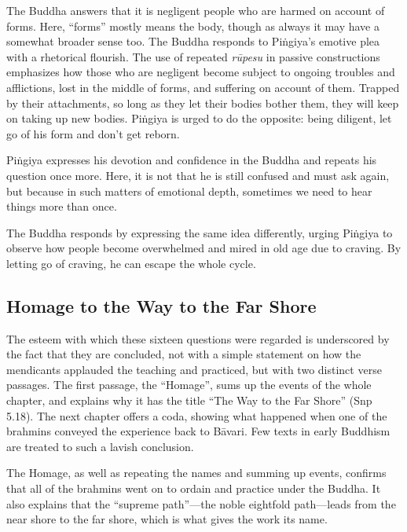 \documentclass[12pt,openany]{book}%
\begin{document}
The Buddha answers that it is negligent people who are harmed on account of forms. Here, “forms” mostly means the body, though as always it may have a somewhat broader sense too. The Buddha responds to \textsanskrit{Piṅgiya}’s emotive plea with a rhetorical flourish. The use of repeated \textit{\textsanskrit{rūpesu}} in passive constructions emphasizes how those who are negligent become subject to ongoing troubles and afflictions, lost in the middle of forms, and suffering on account of them. Trapped by their attachments, so long as they let their bodies bother them, they will keep on taking up new bodies. \textsanskrit{Piṅgiya} is urged to do the opposite: being diligent, let go of his form and don’t get reborn.

\textsanskrit{Piṅgiya} expresses his devotion and confidence in the Buddha and repeats his question once more. Here, it is not that he is still confused and must ask again, but because in such matters of emotional depth, sometimes we need to hear things more than once.

The Buddha responds by expressing the same idea differently, urging \textsanskrit{Piṅgiya} to observe how people become overwhelmed and mired in old age due to craving. By letting go of craving, he can escape the whole cycle.

\subsection*{Homage to the Way to the Far Shore}

The esteem with which these sixteen questions were regarded is underscored by the fact that they are concluded, not with a simple statement on how the mendicants applauded the teaching and practiced, but with two distinct verse passages. The first passage, the “Homage”, sums up the events of the whole chapter, and explains why it has the title “The Way to the Far Shore” (Snp 5.18). The next chapter offers a coda, showing what happened when one of the brahmins conveyed the experience back to \textsanskrit{Bāvari}. Few texts in early Buddhism are treated to such a lavish conclusion.

The Homage, as well as repeating the names and summing up events, confirms that all of the brahmins went on to ordain and practice under the Buddha. It also explains that the “supreme path”—the noble eightfold path—leads from the near shore to the far shore, which is what gives the work its name.
\end{document}
